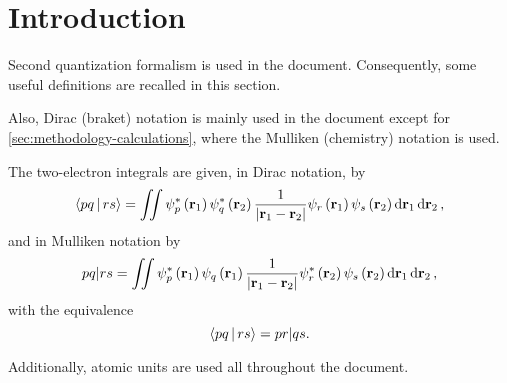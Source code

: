 \graphicspath{{./figures/}}

\section{Introduction}
Second quantization formalism is used in the document. 
Consequently, some useful definitions are recalled
in this section.

Also, Dirac (braket) notation is mainly used in the document except for 
\cref{sec:methodology-calculations}, where the Mulliken (chemistry) notation
is used.

The two-electron integrals are given, in Dirac notation, by 
\begin{equation} \label{eq:dirac-notation}
    \Braket{pq | rs} =
    \iint 
    \psi_p^{*} \left( \mat{r}_1 \right)
    \psi_q^{*} \left( \mat{r}_2 \right)
    \frac{1}{\left| \mat{r}_1 - \mat{r}_2 \right|}
    \psi_r \left( \mat{r}_1 \right)
    \psi_s \left( \mat{r}_2 \right)
    \dd{ \mat{r}_1} \dd{ \mat{r}_2}
    ,
\end{equation}
and in Mulliken notation by
\begin{equation} \label{eq:mulliken-notation}
    \PBraket{pq | rs} =
    \iint 
    \psi_p^{*} \left( \mat{r}_1 \right)
    \psi_q     \left( \mat{r}_1 \right)
    \frac{1}{\left| \mat{r}_1 - \mat{r}_2 \right|}
    \psi_r^{*} \left( \mat{r}_2 \right)
    \psi_s     \left( \mat{r}_2 \right)
    \dd{ \mat{r}_1} \dd{ \mat{r}_2}
    ,
\end{equation}
with the equivalence 
\begin{equation} \label{eq:dirac-mulliken-equivalence}
    \Braket{pq | rs} = \PBraket{pr | qs}
    .
\end{equation}

Additionally, atomic units are used all throughout the document.
